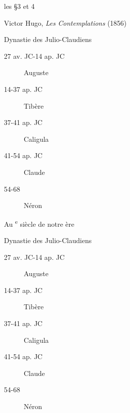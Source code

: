 \documentclass{article}
\newcommand{\prg}[1]{\S #1}%
\newcommand{\oeuvre}[3]{#1, \emph{#2} (#3)}%
\newcommand{\siecle}[1]{\textsc{\romannum{#1}}\textsuperscript{e} siècle\xspace}
\newenvironment{chronologie}[1]{\par #1\begin{description}}{\end{description}}
\begin{document}
les \prg{3} et 4

\oeuvre{Victor Hugo}{Les Contemplations}{1856}

    \begin{chronologie}{Dynastie des Julio-Claudiens}
    \item[27 av. JC-14 ap. JC] Auguste
    \item[14-37 ap. JC] Tibère
    \item[37-41 ap. JC] Caligula
    \item[41-54 ap. JC] Claude
    \item[54-68] Néron
    \end{chronologie}
    



Au \siecle{3} de notre ère


    \begin{chronologie}{Dynastie des Julio-Claudiens}
    \item[27 av. JC-14 ap. JC] Auguste
    \item[14-37 ap. JC] Tibère
    \item[37-41 ap. JC] Caligula
    \item[41-54 ap. JC] Claude
    \item[54-68] Néron
    \end{chronologie}
\end{document}
